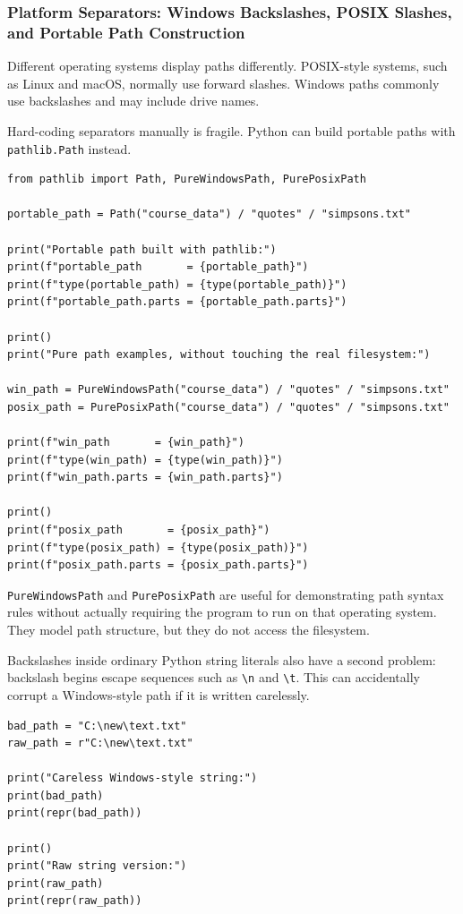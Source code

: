 \subsubsection{Platform Separators: Windows Backslashes, POSIX Slashes, and Portable Path Construction}

Different operating systems display paths differently. POSIX-style systems, such as Linux and macOS, normally use forward slashes. Windows paths commonly use backslashes and may include drive names.

Hard-coding separators manually is fragile. Python can build portable paths with \texttt{pathlib.Path} instead.

\begin{verbatim}
from pathlib import Path, PureWindowsPath, PurePosixPath

portable_path = Path("course_data") / "quotes" / "simpsons.txt"

print("Portable path built with pathlib:")
print(f"portable_path       = {portable_path}")
print(f"type(portable_path) = {type(portable_path)}")
print(f"portable_path.parts = {portable_path.parts}")

print()
print("Pure path examples, without touching the real filesystem:")

win_path = PureWindowsPath("course_data") / "quotes" / "simpsons.txt"
posix_path = PurePosixPath("course_data") / "quotes" / "simpsons.txt"

print(f"win_path       = {win_path}")
print(f"type(win_path) = {type(win_path)}")
print(f"win_path.parts = {win_path.parts}")

print()
print(f"posix_path       = {posix_path}")
print(f"type(posix_path) = {type(posix_path)}")
print(f"posix_path.parts = {posix_path.parts}")
\end{verbatim}

\texttt{PureWindowsPath} and \texttt{PurePosixPath} are useful for demonstrating path syntax rules without actually requiring the program to run on that operating system. They model path structure, but they do not access the filesystem.

Backslashes inside ordinary Python string literals also have a second problem: backslash begins escape sequences such as \texttt{\textbackslash n} and \texttt{\textbackslash t}. This can accidentally corrupt a Windows-style path if it is written carelessly.

\begin{verbatim}
bad_path = "C:\new\text.txt"
raw_path = r"C:\new\text.txt"

print("Careless Windows-style string:")
print(bad_path)
print(repr(bad_path))

print()
print("Raw string version:")
print(raw_path)
print(repr(raw_path))
\end{verbatim}

